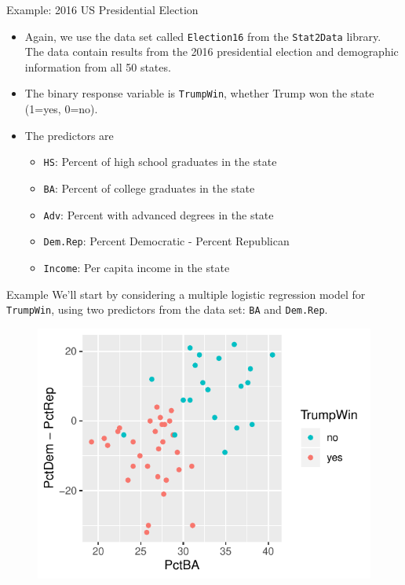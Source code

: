 \documentclass[10pt]{beamer}\usepackage[]{graphicx}\usepackage[]{color}
\begin{document}
\begin{frame}{Example: 2016 US Presidential Election}
\begin{itemize}
\item Again, we use the data set called \texttt{Election16} from the \texttt{Stat2Data} library.  The data contain results from the 2016 presidential election and demographic information from all 50 states.
\vspace{10pt}
\item The binary response variable is \texttt{TrumpWin}, whether Trump won the state (1=yes, 0=no).
\vspace{10pt}
\item The predictors are
\begin{itemize}
\item \texttt{HS}: Percent of high school graduates in the state
\item \texttt{BA}: Percent of college graduates in the state
\item \texttt{Adv}: Percent with advanced degrees in the state
\item \texttt{Dem.Rep}:  Percent Democratic - Percent Republican
\item \texttt{Income}: Per capita income in the state
\end{itemize}
\end{itemize}
\end{frame}

\begin{frame}{Example}
We'll start by considering a multiple logistic regression model for \texttt{TrumpWin}, using two predictors from the data set: \texttt{BA} and \texttt{Dem.Rep}. 
\begin{figure}
\includegraphics[scale=0.8]{figure/scatter1.pdf}
\end{figure}
\end{frame}
\end{document}
